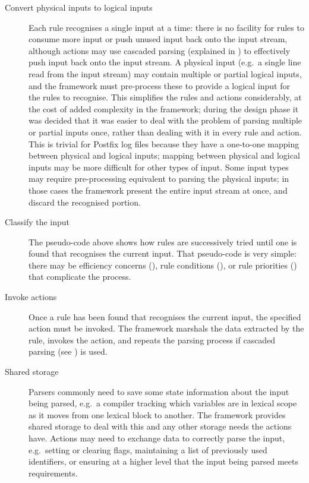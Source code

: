 \begin{description}
    \item [Convert physical inputs to logical inputs] Each rule recognises
        a single input at a time: there is no facility for rules to consume
        more input or push unused input back onto the input stream,
        although actions may use cascaded parsing (explained in
        ) to effectively push input
        back onto the input stream.  A physical input (e.g.\ a single line
        read from the input stream) may contain multiple or partial logical
        inputs, and the framework must pre-process these to provide a
        logical input for the rules to recognise.  This simplifies the
        rules and actions considerably, at the cost of added complexity in
        the framework; during the design phase it was decided that it was
        easier to deal with the problem of parsing multiple or partial
        inputs once, rather than dealing with it in every rule and action.
        This is trivial for Postfix log files because they have a
        one-to-one mapping between physical and logical inputs; mapping
        between physical and logical inputs may be more difficult for other
        types of input.  Some input types may require pre-processing
        equivalent to parsing the physical inputs; in those cases the
        framework present the entire input stream at once, and discard the
        recognised portion.

    \item [Classify the input]  The pseudo-code above shows how rules are
        successively tried until one is found that recognises the current
        input.  That pseudo-code is very simple: there may be efficiency
        concerns (), rule conditions
        (), or rule priorities
        () that complicate the process.

    \item [Invoke actions]  Once a rule has been found that recognises the
        current input, the specified action must be invoked.  The framework
        marshals the data extracted by the rule, invokes the action, and
        repeats the parsing process if cascaded parsing (see
        ) is used.

    \item [Shared storage]  Parsers commonly need to save some state
        information about the input being parsed, e.g.\ a compiler tracking
        which variables are in lexical scope as it moves from one lexical
        block to another.  The framework provides shared storage to deal
        with this and any other storage needs the actions have.  Actions
        may need to exchange data to correctly parse the input, e.g.\
        setting or clearing flags, maintaining a list of previously used
        identifiers, or ensuring at a higher level that the input being
        parsed meets requirements.


\end{description}
